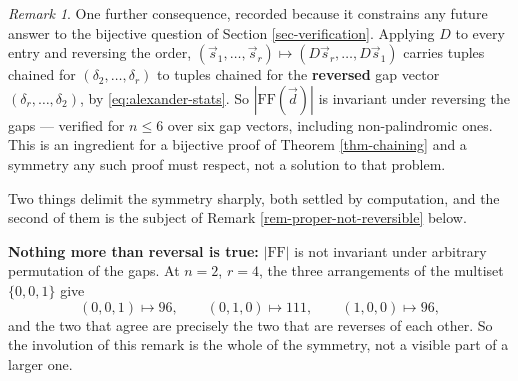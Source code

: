 \documentclass[11pt, a4paper, abstract=yes]{scrartcl}
\theoremstyle{definition}
\theoremstyle{remark}
\newtheorem{remark}[definition]{Remark}
\theoremstyle{plain}
\begin{document}
\begin{remark}
One further consequence, recorded because it constrains any future answer to the bijective question
of Section \ref{sec-verification}. Applying \(D\) to every entry and reversing the order,
\((\vec s_1,\dots,\vec s_r)\mapsto(D\vec s_r,\dots,D\vec s_1)\) carries tuples chained for
\((\delta_2,\dots,\delta_r)\) to tuples chained for the \textbf{reversed} gap vector
\((\delta_r,\dots,\delta_2)\), by \eqref{eq:alexander-stats}. So \(|\mathrm{FF}(\vec d)|\) is
invariant under reversing the gaps --- verified for \(n\le6\) over six gap vectors, including
non-palindromic ones. This is an ingredient for a bijective proof of
Theorem \ref{thm-chaining} and a symmetry any such proof must respect, not a solution to that problem.

Two things delimit the symmetry sharply, both settled by computation, and the second of them is the
subject of Remark \ref{rem-proper-not-reversible} below.

\textbf{Nothing more than reversal is true:} \(\lvert\mathrm{FF}\rvert\) is not invariant under arbitrary
permutation of the gaps. At \(n=2\), \(r=4\), the three arrangements of the multiset
\(\lbrace0,0,1\rbrace\) give
\begin{equation}\label{eq:no-permutation-invariance}
  (0,0,1)\mapsto96,\qquad (0,1,0)\mapsto111,\qquad (1,0,0)\mapsto96 ,
\end{equation}
and the two that agree are precisely the two that are reverses of each other. So the involution of
this remark is the whole of the symmetry, not a visible part of a larger one.
\label{rem-gap-reversal}
\end{remark}
\end{document}
